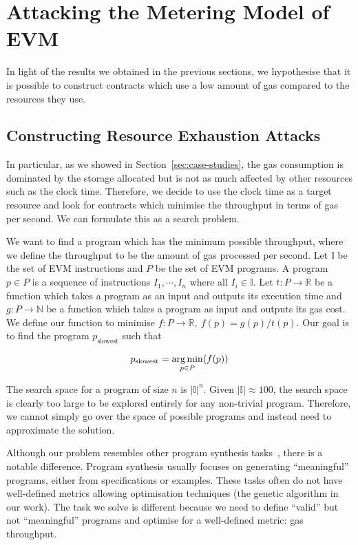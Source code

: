 \section{Attacking the Metering Model of EVM}
\label{sec:attack}
In light of the results we obtained in the previous sections, we hypothesise that it is possible to construct contracts which use a low amount of gas compared to the resources they use. 

\subsection{Constructing Resource Exhaustion Attacks}
In particular, as we showed in Section~\ref{sec:case-studies}, the gas consumption is dominated by the storage allocated but is not as much affected by other resources such as the clock time. Therefore, we decide to use the clock time as a target resource and look for contracts which minimise the throughput in terms of gas per second. We can formulate this as a search problem.

We want to find a program which has the minimum possible throughput, where we define the throughput to be the amount of gas processed per second.
Let $\mathbb{I}$ be the set of EVM instructions and $P$ be the set of EVM programs. A program $p\in P$ is a sequence of instructions $I_1,\cdots,I_n$ where all $I_i \in \mathbb{I}$. Let $t : P \rightarrow \mathbb{R}$ be a function which takes a program as an input and outputs its execution time and $g : P \rightarrow \mathbb{N}$ be a function which takes a program as input and outputs its gas cost. We define our function to minimise $f: P \rightarrow \mathbb{R},~f(p) = g(p) / t(p)$. Our goal is to find the program $p_{\text{slowest}}$ such that

\begin{equation}
  \label{eq:objective}
  p_{\text{slowest}} = \operatorname*{arg\,min}_{p\in P} (f(p))
\end{equation}

The search space for a program of size $n$ is $|\mathbb{I}|^n$. Given $|\mathbb{I}| \approx 100$, the search space is clearly too large to be explored entirely for any non-trivial program. Therefore, we cannot simply go over the space of possible programs and instead need to approximate the solution.

Although our problem resembles other program synthesis tasks~\cite{gulwani2017program}, there is a notable difference. Program synthesis usually focuses on generating ``meaningful'' programs, either from specifications or examples. These tasks often do not have well-defined metrics allowing optimisation techniques (the genetic algorithm in our work). The task we solve is different because we need to define ``valid'' but not ``meaningful'' programs and optimise for a well-defined metric: gas throughput.

